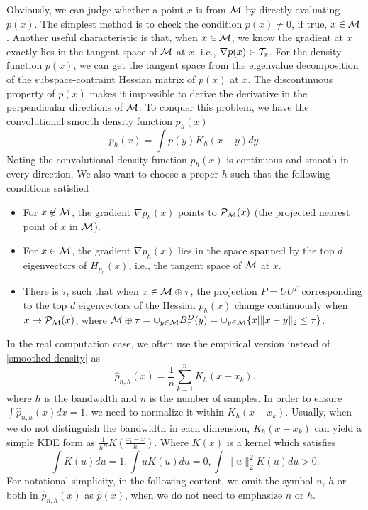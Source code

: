 \documentclass[aos,preprint]{imsart}
\theoremstyle{remark}
\begin{document}
Obviously, we can judge whether a point $x$ is from $\cal M$ by directly evaluating $p(x)$. The simplest method is to check the condition $p(x)\not = 0$, if true, $x\in \cal M$. Another useful characteristic is that, when $x\in \cal M$, we know the gradient at $x$ exactly lies in the tangent space of $\cal M$ at $x$, i.e., $\nabla p(x)\in {\cal T}_x$. For the density function $p(x)$, we can get the tangent space from the eigenvalue decomposition of the subspace-contraint Hessian matrix of $p(x)$ at $x$. The discontinuous property of $p(x)$ makes it impossible to derive the derivative in the perpendicular directions of $\cal M$. To conquer this problem, we have the convolutional smooth density function $p_h(x)$
\begin{equation}\label{smoothed density}
p_h(x) = \int p(y) K_h(x-y)dy.
\end{equation}
Noting the convolutional density function $p_h(x)$ is continuous and smooth in every direction. We also want to choose a proper $h$ such that the following conditions satisfied
\begin{itemize}
\item For $x\not \in \cal M$, the gradient $\nabla p_h(x)$ points to ${\cal P_M}(x)$ (the projected nearest point of $x$ in $\cal M$).
\item For $x\in \cal M$, the gradient $\nabla p_h(x)$ lies in the space spanned by the top $d$ eigenvectors of $H_{p_h}(x)$, i.e., the tangent space of $\cal M$ at $x$.
\item There is $\tau$, such that when $x\in \cal M\oplus \tau$, the projection $P = UU^T$ corresponding to the top $d$ eigenvectors of the Hessian $p_h(x)$ change continuously when $x\rightarrow {\cal P_{\cal M}}(x)$, where ${\cal M}\oplus \tau = \cup_{y\in \cal M} B^D_\tau (y)= \cup_{y\in \cal M} \{x|\|x-y\|_2\leq \tau\}$.
\end{itemize}
In the real computation case, we often use the empirical version instead of \eqref{smoothed density} as
\[
 \hat{p}_{n,h}(x) = \frac{1}{n}\sum_{k=1}^n K_h(x-x_k).
\]
where $h$ is the bandwidth and $n$ is the number of samples. In order to ensure $\int  \hat{p}_{n,h}(x) dx = 1$, we need to normalize it within $K_h(x-x_k)$. Usually, when we do not distinguish the bandwidth in each dimension, $K_h(x-x_k)$ can yield a simple KDE form as $\frac{1}{h^D} K(\frac{x_i-x}{h})$. Where $K(x)$ is a kernel which satisfies
\[
\int K(u) du = 1, \int u K(u) du = 0, \int \|u\|_2^2 K(u) du >0.
\]
For notational simplicity, in the following content, we omit the symbol $n$, $h$ or both in $ \hat{p}_{n,h}(x)$ as $\hat{p}(x)$, when we do not need to emphasize $n$ or $h$.
\end{document}
